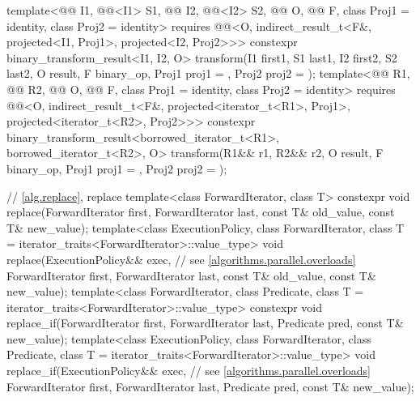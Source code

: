 \begin{codeblock}
{{    template<@@ I1, @@<I1> S1, @@ I2, @@<I2> S2,
             @@ O, @@ F, class Proj1 = identity,
             class Proj2 = identity>
      requires @@<O, indirect_result_t<F&, projected<I1, Proj1>,
                                             projected<I2, Proj2>>>
      constexpr binary_transform_result<I1, I2, O>
        transform(I1 first1, S1 last1, I2 first2, S2 last2, O result,
                  F binary_op, Proj1 proj1 = {}, Proj2 proj2 = {});
    template<@@ R1, @@ R2, @@ O,
             @@ F, class Proj1 = identity, class Proj2 = identity>
      requires @@<O, indirect_result_t<F&, projected<iterator_t<R1>, Proj1>,
                                             projected<iterator_t<R2>, Proj2>>>
      constexpr binary_transform_result<borrowed_iterator_t<R1>, borrowed_iterator_t<R2>, O>
        transform(R1&& r1, R2&& r2, O result,
                  F binary_op, Proj1 proj1 = {}, Proj2 proj2 = {});
  }

  // \ref{alg.replace}, replace
  template<class ForwardIterator, class T>
    constexpr void replace(ForwardIterator first, ForwardIterator last,
                           const T& old_value, const T& new_value);
  template<class ExecutionPolicy, class ForwardIterator,
           class T = iterator_traits<ForwardIterator>::value_type>
    void replace(ExecutionPolicy&& exec,                        // see \ref{algorithms.parallel.overloads}
                 ForwardIterator first, ForwardIterator last,
                 const T& old_value, const T& new_value);
  template<class ForwardIterator, class Predicate,
           class T = iterator_traits<ForwardIterator>::value_type>
    constexpr void replace_if(ForwardIterator first, ForwardIterator last,
                              Predicate pred, const T& new_value);
  template<class ExecutionPolicy, class ForwardIterator, class Predicate,
           class T = iterator_traits<ForwardIterator>::value_type>
    void replace_if(ExecutionPolicy&& exec,                     // see \ref{algorithms.parallel.overloads}
                    ForwardIterator first, ForwardIterator last,
                    Predicate pred, const T& new_value);

}
\end{codeblock}
